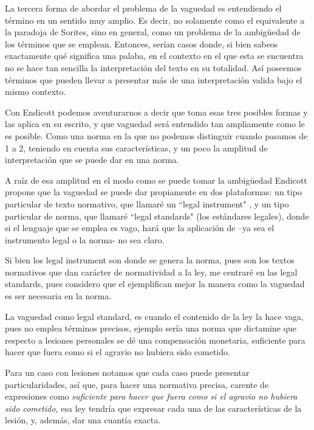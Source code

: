 \documentclass[]{book}
\begin{document}
\begin{refsection}
La tercera forma de abordar el problema de la vaguedad es entendiendo el
término en un sentido muy amplio. Es decir, no solamente como el
equivalente a la paradoja de Sorites, sino en general, como un problema
de la ambigüedad de los términos que se emplean. Entonces, serían casos
donde, si bien sabeos exactamente qué significa una palaba, en el
contexto en el que esta se encuentra no se hace tan sencilla la
interpretación del texto en su totalidad. Así poseemos términos que
pueden llevar a presentar más de una interpretación valida bajo el mismo
contexto.

Con Endicott podemos aventurarnos a decir que toma esas tres posibles
formas y las aplica en su escrito, y que vaguedad será entendido tan
ampliamente como le es posible. Como una norma en la que no podemos
distinguir cuando pasamos de 1 a 2, teniendo en cuenta sus
características, y un poco la amplitud de interpretación que se puede
dar en una norma.

A raíz de esa amplitud en el modo como se puede tomar la ambigüedad
Endicott propone que la vaguedad se puede dar propiamente en dos
plataformas: un tipo particular de texto normativo, que llamaré un
``legal instrument" , y un tipo particular de norma, que llamaré
``legal standards" (los estándares legales), donde si el lenguaje que
se emplea es vago, hará que la aplicación de --ya sea el instrumento
legal o la norma- no sea claro.

Si bien los legal instrument son donde se genera la norma, pues son los
textos normativos que dan carácter de normatividad a la ley, me centraré
en las legal standards, pues considero que el ejemplifican mejor la
manera como la vaguedad es ser necesaria en la norma.

La vaguedad como legal standard, es cuando el contenido de la ley la
hace vaga, pues no emplea términos precisos, ejemplo sería una norma que
dictamine que respecto a lesiones personales se dé una compensación
monetaria, suficiente para hacer que fuera como si el agravio no hubiera
sido cometido.

Para un caso con lesiones notamos que cada caso puede presentar
particularidades, así que, para hacer una normativa precisa, carente de
expresiones como \emph{suficiente para hacer que fuera como si el
agravio no hubiera sido cometido,} esa ley tendría que expresar cada una
de las características de la lesión, y, además, dar una cuantía exacta.


\end{refsection}
\end{document}
